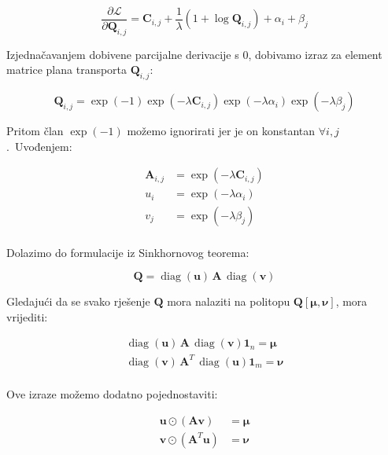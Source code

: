 \documentclass[diplomskirad]{fer}
\begin{document}
\begin{equation}
  \frac{\partial \mathcal{L}}{\partial \bm{Q}_{i,j}} = \bm{C}_{i,j} + \frac{1}{\lambda} (1 + \log \bm{Q}_{i,j}) + \alpha_{i} + \beta_{j}
  \label{eq:sk_deriv}
\end{equation}

Izjednačavanjem dobivene parcijalne derivacije s $0$, dobivamo izraz za element matrice plana transporta $\bm{Q}_{i,j}$:

\begin{equation}
  \bm{Q}_{i,j} = \exp(-1) \exp(-\lambda \bm{C}_{i,j}) \exp(-\lambda \alpha_{i}) \exp(-\lambda \beta_{j})
  \label{eq:sk_one_el}
\end{equation}

Pritom član $\exp(-1)$ možemo ignorirati jer je on konstantan $\forall i,j$.\ Uvođenjem:

\begin{equation}
  \begin{aligned}
    \bm{A}_{i,j} &= \exp(-\lambda \bm{C}_{i,j}) \\
    u_{i} &= \exp(-\lambda \alpha_{i}) \\
    v_{j} &= \exp(-\lambda \beta_{j}) \\
  \end{aligned}
  \label{eq:sk_alias}
\end{equation}

Dolazimo do formulacije iz Sinkhornovog teorema:

\begin{equation}
  \bm{Q} = \operatorname{diag}(\bm{u})\,\bm{A}\,\operatorname{diag}(\bm{v})
  \label{eq:sk_q_formula}
\end{equation}

Gledajući da se svako rješenje $\bm{Q}$ mora nalaziti na politopu $\bm{Q}\left[ \bm{\mu}, \bm{\nu} \right]$, mora vrijediti:

\begin{equation}
  \begin{aligned}
    \operatorname{diag}(\bm{u})\,\bm{A}\,\operatorname{diag}(\bm{v}) \bm{1}_n = \bm{\mu} \\
    \operatorname{diag}(\bm{v})\,\bm{A}^T\,\operatorname{diag}(\bm{u}) \bm{1}_m = \bm{\nu} \\
  \end{aligned}
  \label{eq:sk_conditions}
\end{equation}

Ove izraze možemo dodatno pojednostaviti:

\begin{equation}
  \begin{aligned}
    \bm{u} \odot (\bm{A} \bm{v}) &= \bm{\mu} \\
    \bm{v} \odot (\bm{A}^T \bm{u}) &= \bm{\nu} \\
  \end{aligned}
  \label{eq:sk_conditions_simplified}
\end{equation}
\end{document}
